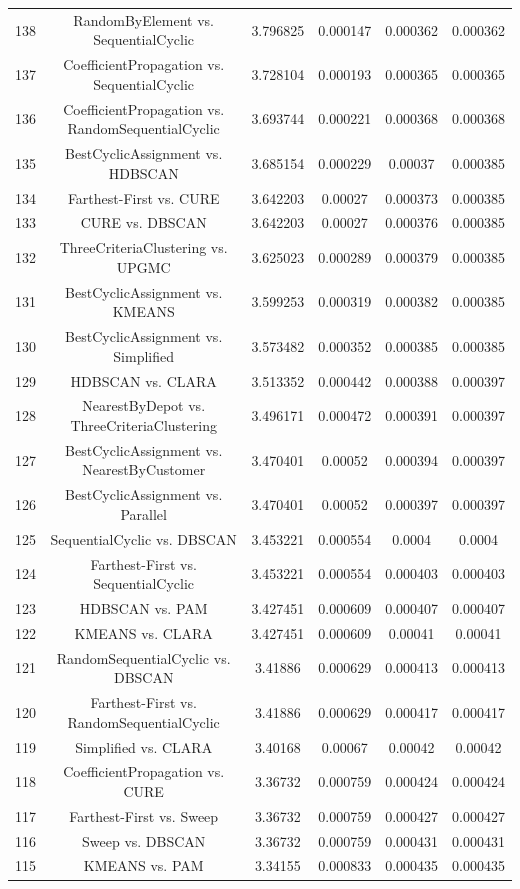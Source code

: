 \documentclass[a4paper,10pt]{article}
\begin{document}
\begin{landscape}
\begin{table}[!htp]
\begin{tabular}{cccccc}
138&RandomByElement vs. SequentialCyclic&3.796825&0.000147&0.000362&0.000362\\
137&CoefficientPropagation vs. SequentialCyclic&3.728104&0.000193&0.000365&0.000365\\
136&CoefficientPropagation vs. RandomSequentialCyclic&3.693744&0.000221&0.000368&0.000368\\
135&BestCyclicAssignment vs. HDBSCAN&3.685154&0.000229&0.00037&0.000385\\
134&Farthest-First vs. CURE&3.642203&0.00027&0.000373&0.000385\\
133&CURE vs. DBSCAN&3.642203&0.00027&0.000376&0.000385\\
132&ThreeCriteriaClustering vs. UPGMC&3.625023&0.000289&0.000379&0.000385\\
131&BestCyclicAssignment vs. KMEANS&3.599253&0.000319&0.000382&0.000385\\
130&BestCyclicAssignment vs. Simplified&3.573482&0.000352&0.000385&0.000385\\
129&HDBSCAN vs. CLARA&3.513352&0.000442&0.000388&0.000397\\
128&NearestByDepot vs. ThreeCriteriaClustering&3.496171&0.000472&0.000391&0.000397\\
127&BestCyclicAssignment vs. NearestByCustomer&3.470401&0.00052&0.000394&0.000397\\
126&BestCyclicAssignment vs. Parallel&3.470401&0.00052&0.000397&0.000397\\
125&SequentialCyclic vs. DBSCAN&3.453221&0.000554&0.0004&0.0004\\
124&Farthest-First vs. SequentialCyclic&3.453221&0.000554&0.000403&0.000403\\
123&HDBSCAN vs. PAM&3.427451&0.000609&0.000407&0.000407\\
122&KMEANS vs. CLARA&3.427451&0.000609&0.00041&0.00041\\
121&RandomSequentialCyclic vs. DBSCAN&3.41886&0.000629&0.000413&0.000413\\
120&Farthest-First vs. RandomSequentialCyclic&3.41886&0.000629&0.000417&0.000417\\
119&Simplified vs. CLARA&3.40168&0.00067&0.00042&0.00042\\
118&CoefficientPropagation vs. CURE&3.36732&0.000759&0.000424&0.000424\\
117&Farthest-First vs. Sweep&3.36732&0.000759&0.000427&0.000427\\
116&Sweep vs. DBSCAN&3.36732&0.000759&0.000431&0.000431\\
115&KMEANS vs. PAM&3.34155&0.000833&0.000435&0.000435\\

\end{tabular}
\end{table}
\end{landscape}
\end{document}
